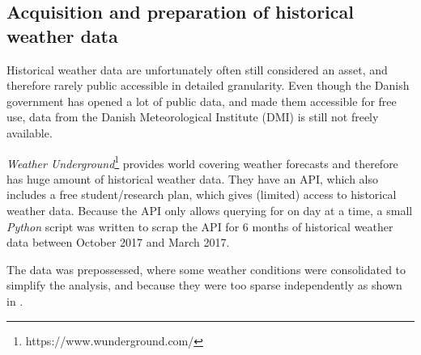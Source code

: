 
\subsection{Acquisition and preparation of historical weather data}
\label{appx:weather_data_prep}

Historical weather data are unfortunately often still considered an asset, and therefore rarely public accessible in detailed granularity. Even though the Danish government has opened a lot of public data, and made them accessible for free use, data from the Danish Meteorological Institute (DMI) is still not freely available.

\emph{Weather Underground}\footnote{https://www.wunderground.com/} provides world covering weather forecasts and therefore has huge amount of historical weather data. They have an API, which also includes a free student/research plan, which gives (limited) access to historical weather data. Because the API only allows querying for on day at a time, a small \emph{Python} script was written to scrap the API for 6 months of historical weather data between October 2017 and March 2017.

The data was prepossessed, where some weather conditions were consolidated to simplify the analysis, and because they were too sparse independently as shown in .

